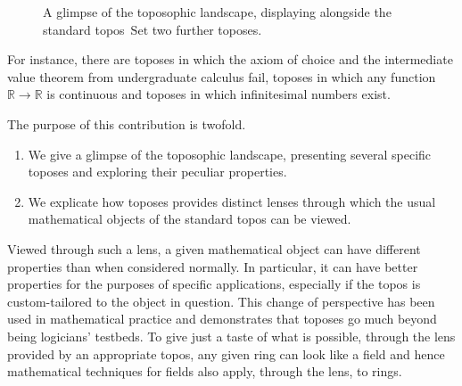 \documentclass[oneside,reqno]{amsart}
\theoremstyle{definition}
\theoremstyle{plain}
\theoremstyle{remark}
\newcommand{\RR}{\mathbb{R}}
\newcommand{\Set}{\mathrm{Set}}
\renewcommand{\_}{\mathpunct{.}\,}
\newcommand{\?}{\,{:}\,}
\begin{document}
\begin{figure}

  \caption{\label{fig:landscape}A glimpse of the toposophic landscape,
  displaying alongside the standard topos~$\Set$ two further toposes.}
\end{figure}


For instance, there are toposes in which the axiom of choice and the
intermediate value theorem from undergraduate calculus fail, toposes in which
any function~$\RR \to \RR$ is continuous and toposes in which infinitesimal
numbers exist.

The purpose of this contribution is twofold.
\begin{enumerate}
\item We give a glimpse of the toposophic landscape, presenting several
specific toposes and exploring their peculiar properties.

\item We explicate how toposes provides distinct lenses through which the
usual mathematical objects of the standard topos can be viewed.
\end{enumerate}

Viewed through such a lens, a given mathematical object can have different
properties than when considered normally. In particular, it can have
better properties for the purposes of specific applications, especially if
the topos is custom-tailored to the object in question. This change of
perspective has been used in mathematical practice and demonstrates that
toposes go much beyond being logicians' testbeds. To give just a taste of what
is possible, through the lens provided by an appropriate topos, any given ring
can look like a field and hence mathematical techniques for fields also apply,
through the lens, to rings.
\end{document}
